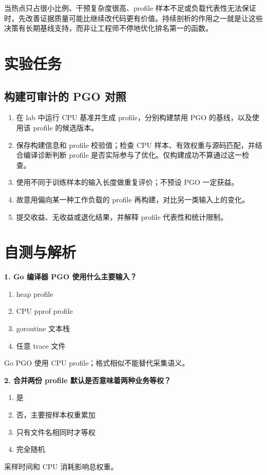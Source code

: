 \documentclass[UTF8,fontset=fandol,openany,11pt]{ctexbook}
\begin{document}
当热点只占很小比例、干预复杂度很高、profile 样本不足或负载代表性无法保证时，先改善证据质量可能比继续改代码更有价值。持续剖析的作用之一就是让这些决策有长期基线支持，而非让工程师不停地优化排名第一的函数。

\section{实验任务}
\subsection*{构建可审计的 PGO 对照}
\begin{enumerate}
\item 在 lab 中运行 CPU 基准并生成 profile，分别构建禁用 PGO 的基线，以及使用该 profile 的候选版本。

\item 保存构建信息和 profile 校验值；检查 CPU 样本、有效权重与源码匹配，并结合编译诊断判断 profile 是否实际参与了优化。仅构建成功不算通过这一检查。

\item 使用不同于训练样本的输入长度做重复评价；不预设 PGO 一定获益。

\item 故意用偏向某一种工作负载的 profile 再构建，对比另一类输入上的变化。

\item 提交收益、无收益或退化结果，并解释 profile 代表性和统计限制。

\end{enumerate}
\section{自测与解析}
\noindent\textbf{1. Go 编译器 PGO 使用什么主要输入？}
\begin{enumerate}[label=\Alph*.]
\item heap profile
\item CPU pprof profile
\item goroutine 文本栈
\item 任意 trace 文件
\end{enumerate}
Go PGO 使用 CPU profile；格式相似不能替代采集语义。

\noindent\textbf{2. 合并两份 profile 默认是否意味着两种业务等权？}
\begin{enumerate}[label=\Alph*.]
\item 是
\item 否，主要按样本权重累加
\item 只有文件名相同时才等权
\item 完全随机
\end{enumerate}
采样时间和 CPU 消耗影响总权重。
\end{document}
